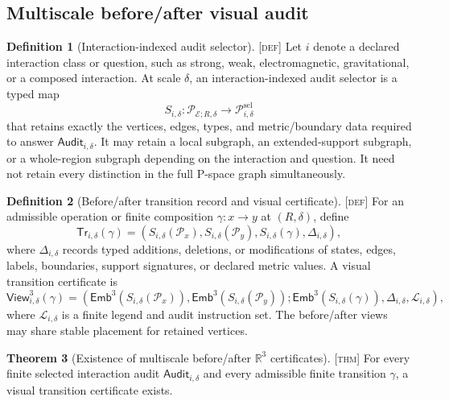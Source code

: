 \documentclass[11pt]{article}
\newcommand{\Pspace}{\ensuremath{\mathcal{P}}}
\newcommand{\Audit}{\ensuremath{\mathsf{Audit}}}
\newcommand{\View}{\ensuremath{\mathsf{View}}}
\newcommand{\Emb}{\ensuremath{\mathsf{Emb}}}
\newcommand{\Tr}{\ensuremath{\mathsf{Tr}}}
\newcommand{\Defn}{\textsc{[def]}}
\newcommand{\Thm}{\textsc{[thm]}}
\theoremstyle{definition}
\newtheorem{sdefinition}{Definition}
\newtheorem{stheorem}[sdefinition]{Theorem}
\begin{document}
\subsection{Multiscale before/after visual audit}

\begin{sdefinition}[Interaction-indexed audit selector]
\label{arch:def-selector}
\Defn{} Let $i$ denote a declared interaction class or question, such as strong,
weak, electromagnetic, gravitational, or a composed interaction. At scale
$\delta$, an interaction-indexed audit selector is a typed map
\begin{equation}
S_{i,\delta}:\Pspace_{\mathcal E;R,\delta}\longrightarrow
\Pspace^{\mathrm{sel}}_{i,\delta}
\label{arch:eq-selector}
\end{equation}
that retains exactly the vertices, edges, types, and metric/boundary data required
to answer $\Audit_{i,\delta}$. It may retain a local subgraph, an extended-support
subgraph, or a whole-region subgraph depending on the interaction and question. It
need not retain every distinction in the full P-space graph simultaneously.
\end{sdefinition}

\begin{sdefinition}[Before/after transition record and visual certificate]
\label{arch:def-before-after}
\Defn{} For an admissible operation or finite composition $\gamma:x\to y$ at
$(R,\delta)$, define
\begin{equation}
\Tr_{i,\delta}(\gamma)=
\left(S_{i,\delta}(\Pspace_x),S_{i,\delta}(\Pspace_y),
S_{i,\delta}(\gamma),\Delta_{i,\delta}\right),
\label{arch:eq-transition-record}
\end{equation}
where $\Delta_{i,\delta}$ records typed additions, deletions, or modifications of
states, edges, labels, boundaries, support signatures, or declared metric values.
A visual transition certificate is
\begin{equation}
\View^3_{i,\delta}(\gamma)=
\left(\Emb^3(S_{i,\delta}(\Pspace_x)),\Emb^3(S_{i,\delta}(\Pspace_y));
\Emb^3(S_{i,\delta}(\gamma)),\Delta_{i,\delta},\mathcal L_{i,\delta}\right),
\label{arch:eq-visual-certificate}
\end{equation}
where $\mathcal L_{i,\delta}$ is a finite legend and audit instruction set. The
before/after views may share stable placement for retained vertices.
\end{sdefinition}

\begin{stheorem}[Existence of multiscale before/after $\mathbb R^3$ certificates]
\label{arch:thm-before-after}
\Thm{} For every finite selected interaction audit $\Audit_{i,\delta}$ and every
admissible finite transition $\gamma$, a visual transition certificate exists.
\end{stheorem}
\end{document}
